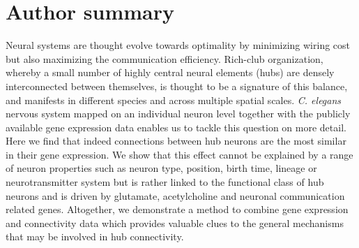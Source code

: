\documentclass[10pt,letterpaper]{article}
\begin{document}



\section*{Author summary}
Neural systems are thought evolve towards optimality by minimizing wiring cost but also maximizing the communication efficiency.
Rich-club organization, whereby a small number of highly central neural elements (hubs) are densely interconnected between themselves, is thought to be a signature of this balance, and manifests in different species and across multiple spatial scales.
\textit{C. elegans} nervous system mapped on an individual neuron level together with the publicly available gene expression data enables us to tackle this question on more detail.
Here we find that indeed connections between hub neurons are the most similar in their gene expression.
We show that this effect cannot be explained by a range of neuron properties such as neuron type, position, birth time, lineage or neurotransmitter system but is rather linked to the functional class of hub neurons and is driven by glutamate, acetylcholine and neuronal communication related genes.
Altogether, we demonstrate a method to combine gene expression and connectivity data which provides valuable clues to the general mechanisms that may be involved in hub connectivity.
\end{document}

